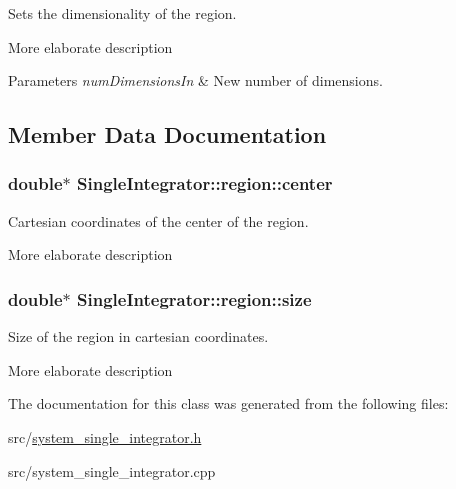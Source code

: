 Sets the dimensionality of the region. 

More elaborate description


\begin{DoxyParams}{Parameters}
{\em num\-Dimensions\-In} & New number of dimensions. \\
\hline
\end{DoxyParams}


\subsection{Member Data Documentation}
\hypertarget{class_single_integrator_1_1region_ac367d8adb1be3f99398e81b5ec36b037}{
\subsubsection[{center}]{\setlength{\rightskip}{0pt plus 5cm}double$\ast$ Single\-Integrator\-::region\-::center}}\label{class_single_integrator_1_1region_ac367d8adb1be3f99398e81b5ec36b037}


Cartesian coordinates of the center of the region. 

More elaborate description \hypertarget{class_single_integrator_1_1region_a9d6383ae1033e22b80fe6f2fdebbfaed}{
\subsubsection[{size}]{\setlength{\rightskip}{0pt plus 5cm}double$\ast$ Single\-Integrator\-::region\-::size}}\label{class_single_integrator_1_1region_a9d6383ae1033e22b80fe6f2fdebbfaed}


Size of the region in cartesian coordinates. 

More elaborate description 

The documentation for this class was generated from the following files\-:\begin{DoxyCompactItemize}
\item 
src/\hyperlink{system__single__integrator_8h}{system\-\_\-single\-\_\-integrator.\-h}\item 
src/system\-\_\-single\-\_\-integrator.\-cpp\end{DoxyCompactItemize}
